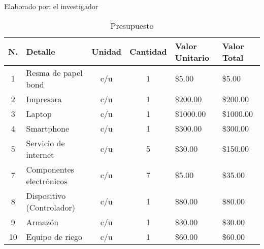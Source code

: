\begin{ThreePartTable}
	\begin{TableNotes}[flushleft]
		\centering
		\item Elaborado por: el investigador
	\end{TableNotes}
	\begin{longtable}{c p{} c c p{} p{}}
		\caption{Presupuesto}
		\label{table:presupuesto}                                                                                                                                          \\
		\toprule
		\textbf{N.}                                     & \textbf{Detalle}          & \textbf{Unidad} & \textbf{Cantidad} & \textbf{Valor Unitario} & \textbf{Valor Total} \\
		\midrule
		1                                               & Resma de papel bond       & c/u             & 1                 & \$5.00                  & \$5.00               \\
		2                                               & Impresora                 & c/u             & 1                 & \$200.00                & \$200.00             \\
		3                                               & Laptop                    & c/u             & 1                 & \$1000.00               & \$1000.00            \\
		4                                               & Smartphone                & c/u             & 1                 & \$300.00                & \$300.00             \\
		5                                               & Servicio de internet      & c/u             & 5                 & \$30.00                 & \$150.00             \\
		7                                               & Componentes electrónicos  & c/u             & 7                 & \$5.00                  & \$35.00              \\
		8                                               & Dispositivo (Controlador) & c/u             & 1                 & \$80.00                 & \$80.00              \\
		9                                               & Armazón                   & c/u             & 1                 & \$30.00                 & \$30.00              \\
		10                                              & Equipo de riego           & c/u             & 1                 & \$60.00                 & \$60.00              \\

\end{longtable}
\end{ThreePartTable}
